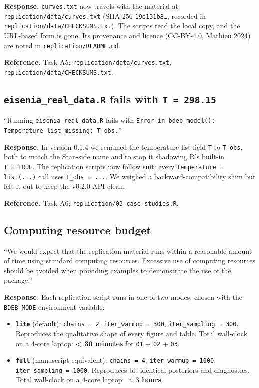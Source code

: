 \documentclass[11pt,a4paper]{article}
\newcommand{\code}[1]{\texttt{#1}}
\begin{document}
\textbf{Response.} \code{curves.txt} now travels with the material at
\code{replication/data/curves.txt} (SHA-256 \code{19e131b8\ldots},
recorded in \code{replication/data/CHECKSUMS.txt}). The scripts read the
local copy, and the URL-based form is gone. Its provenance and licence
(CC-BY-4.0, Mathieu 2024) are noted in \code{replication/README.md}.

\textbf{Reference.} Task A5; \code{replication/data/curves.txt},
\code{replication/data/CHECKSUMS.txt}.

\subsection{\code{eisenia\_real\_data.R} fails with \code{T~=~298.15}}

\begin{displayquote}
``Running \code{eisenia\_real\_data.R} fails with
\verb|Error in bdeb_model():|\allowbreak{} \verb|Temperature list missing: T_obs.|''
\end{displayquote}

\textbf{Response.} In version 0.1.4 we renamed the temperature-list field
\code{T} to \code{T\_obs}, both to match the Stan-side name and to stop it
shadowing R's built-in \code{T~=~TRUE}. The replication scripts now
follow suit: every \verb|temperature = list(...)| call uses
\verb|T_obs = ...|. We weighed a backward-compatibility shim but left it
out to keep the v0.2.0 API clean.

\textbf{Reference.} Task A6; \code{replication/03\_case\_studies.R}.

\subsection{Computing resource budget}

\begin{displayquote}
``We would expect that the replication material runs within a
reasonable amount of time using standard computing resources.
Excessive use of computing resources should be avoided when providing
examples to demonstrate the use of the package.''
\end{displayquote}

\textbf{Response.} Each replication script runs in one of two modes,
chosen with the \code{BDEB\_MODE} environment variable:

\begin{itemize}[nosep]
\item \textbf{\code{lite}} (default): \verb|chains = 2|,
  \verb|iter_warmup = 300|, \verb|iter_sampling = 300|. Reproduces the
  qualitative shape of every figure and table. Total wall-clock on a
  4-core laptop: \textbf{< 30 minutes} for \code{01} + \code{02} +
  \code{03}.
\item \textbf{\code{full}} (manuscript-equivalent): \verb|chains = 4|,
  \verb|iter_warmup = 1000|, \verb|iter_sampling = 1000|. Reproduces
  bit-identical posteriors and diagnostics. Total wall-clock on a 4-core
  laptop: \textbf{$\approx 3$ hours}.
\end{itemize}
\end{document}
